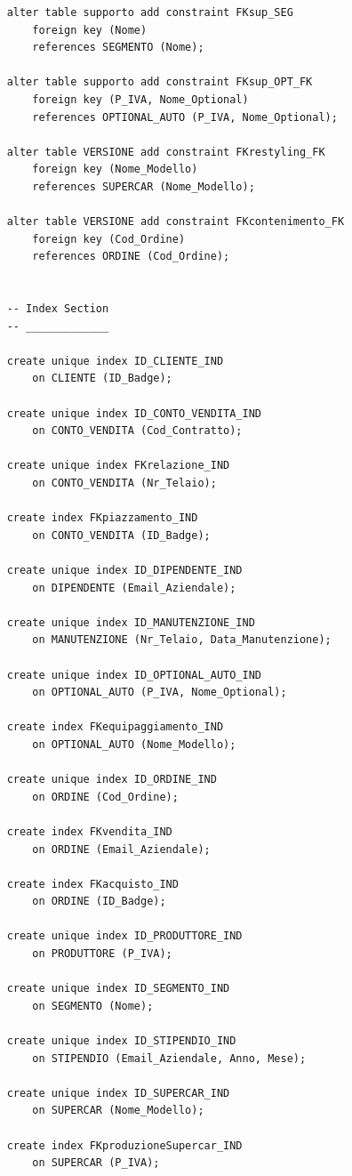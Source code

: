 \documentclass[11pt]{article}
\begin{document}
\begin{lstlisting}
    alter table supporto add constraint FKsup_SEG
        foreign key (Nome)
        references SEGMENTO (Nome);

    alter table supporto add constraint FKsup_OPT_FK
        foreign key (P_IVA, Nome_Optional)
        references OPTIONAL_AUTO (P_IVA, Nome_Optional);

    alter table VERSIONE add constraint FKrestyling_FK
        foreign key (Nome_Modello)
        references SUPERCAR (Nome_Modello);

    alter table VERSIONE add constraint FKcontenimento_FK
        foreign key (Cod_Ordine)
        references ORDINE (Cod_Ordine);


    -- Index Section
    -- _____________ 

    create unique index ID_CLIENTE_IND
        on CLIENTE (ID_Badge);

    create unique index ID_CONTO_VENDITA_IND
        on CONTO_VENDITA (Cod_Contratto);

    create unique index FKrelazione_IND
        on CONTO_VENDITA (Nr_Telaio);

    create index FKpiazzamento_IND
        on CONTO_VENDITA (ID_Badge);

    create unique index ID_DIPENDENTE_IND
        on DIPENDENTE (Email_Aziendale);

    create unique index ID_MANUTENZIONE_IND
        on MANUTENZIONE (Nr_Telaio, Data_Manutenzione);

    create unique index ID_OPTIONAL_AUTO_IND
        on OPTIONAL_AUTO (P_IVA, Nome_Optional);

    create index FKequipaggiamento_IND
        on OPTIONAL_AUTO (Nome_Modello);

    create unique index ID_ORDINE_IND
        on ORDINE (Cod_Ordine);

    create index FKvendita_IND
        on ORDINE (Email_Aziendale);

    create index FKacquisto_IND
        on ORDINE (ID_Badge);

    create unique index ID_PRODUTTORE_IND
        on PRODUTTORE (P_IVA);

    create unique index ID_SEGMENTO_IND
        on SEGMENTO (Nome);

    create unique index ID_STIPENDIO_IND
        on STIPENDIO (Email_Aziendale, Anno, Mese);

    create unique index ID_SUPERCAR_IND
        on SUPERCAR (Nome_Modello);

    create index FKproduzioneSupercar_IND
        on SUPERCAR (P_IVA);


\end{lstlisting}
\end{document}
